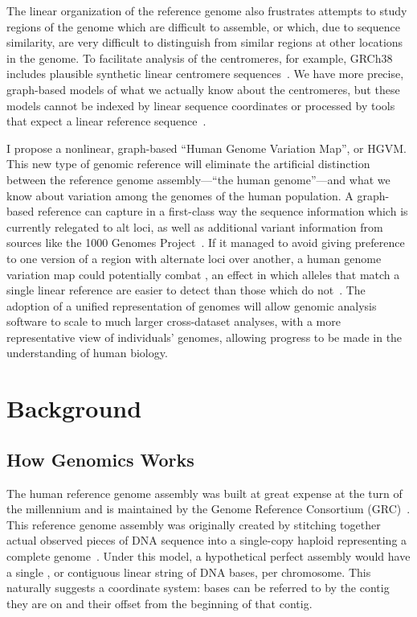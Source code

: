 The linear organization of the reference genome also frustrates attempts to study regions of the genome which are difficult to assemble, or which, due to sequence similarity, are very difficult to distinguish from similar regions at other locations in the genome. To facilitate analysis of the centromeres, for example, GRCh38 includes plausible synthetic linear centromere sequences~\cite{karolchik2014new}. We have more precise, graph-based models of what we actually know about the centromeres, but these models cannot be indexed by linear sequence coordinates or processed by tools that expect a linear reference sequence~\cite{miga2014centromere}.

\begin{sloppypar}
I propose a nonlinear, graph-based ``Human Genome Variation Map'', or HGVM. This new type of genomic reference will eliminate the artificial distinction between the reference genome assembly---``the human genome''---and what we know about variation among the genomes of the human population. A graph-based reference can capture in a first-class way the sequence information which is currently relegated to alt loci, as well as additional variant information from sources like the 1000 Genomes Project~\cite{10002015global}. If it managed to avoid giving preference to one version of a region with alternate loci over another, a human genome variation map could potentially combat , an effect in which alleles that match a single linear reference are easier to detect than those which do not~\cite{degner2009effect,brandt2015mapping}. The adoption of a unified representation of genomes will allow genomic analysis software to scale to much larger cross-dataset analyses, with a more representative view of individuals' genomes, allowing progress to be made in the understanding of human biology.
\end{sloppypar}

\section{Background}

\subsection{How Genomics Works}

The human reference genome assembly was built at great expense at the turn of the millennium and is maintained by the Genome Reference Consortium (GRC)~\cite{church2011modernizing}. This reference genome assembly was originally created by stitching together actual observed pieces of DNA sequence into a single-copy haploid  representing a complete genome~\cite{church2011modernizing}. Under this model, a hypothetical perfect assembly would have a single , or contiguous linear string of DNA bases, per chromosome. This naturally suggests a coordinate system: bases can be referred to by the contig they are on and their offset from the beginning of that contig.

